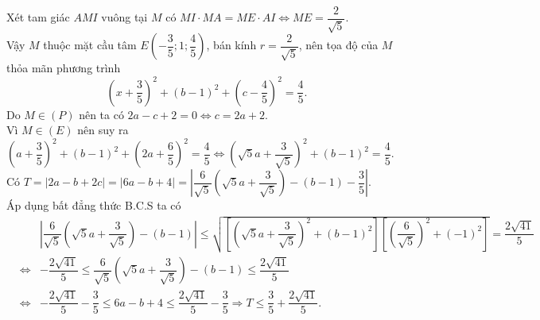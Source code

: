 \begin{ex}
{Xét tam giác $AMI$ vuông tại $M$ có $MI\cdot MA=ME\cdot AI\Leftrightarrow ME=\dfrac{2}{\sqrt{5}}$. \\
Vậy $M$ thuộc mặt cầu tâm $E\left(-\dfrac{3}{5};1;\dfrac{4}{5}\right)$, bán kính $r=\dfrac{2}{\sqrt{5}}$, nên tọa độ của $M$ thỏa mãn phương trình 
$$\left(x+\dfrac{3}{5}\right)^2+(b-1)^2+\left(c-\dfrac{4}{5}\right)^2=\dfrac{4}{5}.$$
Do $M\in (P)$ nên ta có $2a-c+2=0\Leftrightarrow c=2a+2.$\\
Vì $M\in (E)$ nên suy ra $\left(a+\dfrac{3}{5}\right)^2+(b-1)^2+\left(2a+\dfrac{6}{5}\right)^2=\dfrac{4}{5}\Leftrightarrow \left(\sqrt{5}a+\dfrac{3}{\sqrt{5}}\right)^2+(b-1)^2=\dfrac{4}{5}$.\\
Có $T=|2a-b+2c|=|6a-b+4|=\left|\dfrac{6}{\sqrt{5}}\left(\sqrt{5}a+\dfrac{3}{\sqrt{5}}\right)-(b-1)-\dfrac{3}{5}\right|$. \\
Áp dụng bất đẳng thức B.C.S ta có 
\begin{eqnarray*}
	& &\left|\dfrac{6}{\sqrt{5}}\left(\sqrt{5}a+\dfrac{3}{\sqrt{5}}\right)-(b-1)\right|\le \sqrt{\left[\left(\sqrt{5}a+\dfrac{3}{\sqrt{5}}\right)^2+(b-1)^2\right]\left[\left(\dfrac{6}{\sqrt{5}}\right)^2+(-1)^2\right]}=\dfrac{2\sqrt{41}}{5}\\
	&\Leftrightarrow& -\dfrac{2\sqrt{41}}{5}\le \dfrac{6}{\sqrt{5}}\left(\sqrt{5}a+\dfrac{3}{\sqrt{5}}\right)-(b-1)\le \dfrac{2\sqrt{41}}{5} \\
	&\Leftrightarrow &-\dfrac{2\sqrt{41}}{5}-\dfrac{3}{5}\le 6a-b+4\le \dfrac{2\sqrt{41}}{5}-\dfrac{3}{5}\Rightarrow T\le \dfrac{3}{5}+\dfrac{2\sqrt{41}}{5}.
\end{eqnarray*}
}
\end{ex}
